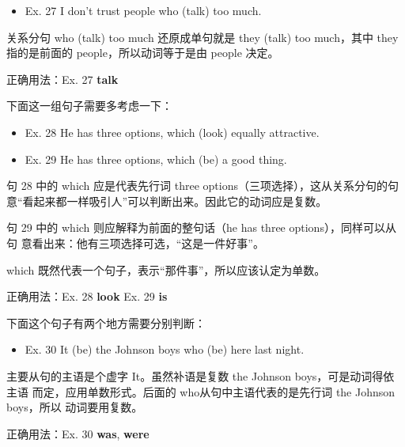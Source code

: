 \begin{mybox}

  \begin{itemize}
  \item   Ex. 27 I don't trust people who (talk) too much.
  \end{itemize}

  关系分句 who (talk) too much 还原成单句就是 they (talk) too much，其中
  they 指的是前面的 people，所以动词等于是由 people 决定。

  \tcblower

  正确用法：Ex. 27 \textbf{talk}
\end{mybox}

下面这一组句子需要多考虑一下：
\begin{mybox}

  \begin{itemize}
  \item   Ex. 28 He has three options, which (look) equally attractive.
  \item   Ex. 29 He has three options, which (be) a good thing.
  \end{itemize}

  句 28 中的 which 应是代表先行词 three options（三项选择），这从关系分句的句
  意“看起来都一样吸引人”可以判断出来。因此它的动词应是复数。

  句 29 中的 which 则应解释为前面的整句话（he has three options），同样可以从句
  意看出来：他有三项选择可选，“这是一件好事”。

  which 既然代表一个句子，表示“那件事”，所以应该认定为单数。

  \tcblower

  正确用法：Ex. 28 \textbf{look} \qquad\quad Ex. 29 \textbf{is}
\end{mybox}

下面这个句子有两个地方需要分别判断：

\begin{mybox}

  \begin{itemize}
  \item   Ex. 30 It (be) the Johnson boys who (be) here last night.
  \end{itemize}

  主要从句的主语是个虚字 It。虽然补语是复数 the Johnson boys，可是动词得依主语
  而定，应用单数形式。后面的 who从句中主语代表的是先行词 the Johnson boys，所以
  动词要用复数。

  \tcblower

  正确用法：Ex. 30 \textbf{was}, \textbf{were}
\end{mybox}

